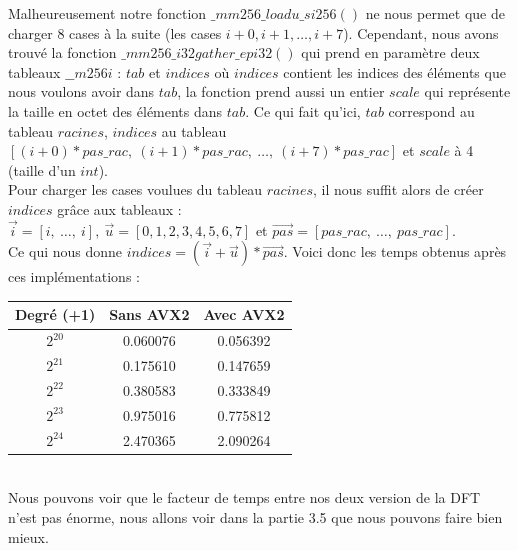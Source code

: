 \documentclass[12pt, a4paper]{article}
\begin{document}
Malheureusement notre fonction $\_mm256\_loadu\_si256()$ ne nous permet que de charger 8 cases à la suite (les cases $i+0, i+1,\dots,i+7$).
Cependant, nous avons trouvé la fonction $\_mm256\_i32gather\_epi32()$ qui prend en paramètre deux tableaux $\_\_m256i$ : $tab$ et $indices$ où $indices$ contient les indices des éléments que nous voulons avoir dans $tab$, la fonction prend aussi un entier $scale$ qui représente la taille en octet des éléments dans $tab$. Ce qui fait qu'ici, $tab$ correspond au tableau $racines$, $indices$ au tableau $[(i+0)*pas\_rac,\ (i+1)*pas\_rac,\ \dots,\ (i+7)*pas\_rac]$ et $scale$ à 4 (taille d'un $int$).\\
\indent Pour charger les cases voulues du tableau $racines$, il nous suffit alors de créer $indices$ grâce aux tableaux : \\ $\overrightarrow{i} = [i,\ \dots,\ i],\  \overrightarrow{u} = [0, 1, 2, 3, 4, 5, 6, 7]$ et $ \overrightarrow{pas} = [pas\_rac,\ \dots,\ pas\_rac]$. \\
Ce qui nous donne $indices = (\overrightarrow{i}+\overrightarrow{u})*\overrightarrow{pas}$.
\newpage	
Voici donc les temps obtenus après ces implémentations :

\begin{center}
\begin{tabular}{||c c c||}
\hline
Degré (+1) & Sans AVX2 & Avec AVX2 \\
\hline\hline
$2^{20}$ & 0.060076 & 0.056392 \\
\hline
$2^{21}$ & 0.175610 & 0.147659 \\
\hline
$2^{22}$ & 0.380583 & 0.333849 \\
\hline
$2^{23}$ & 0.975016 & 0.775812 \\
\hline
$2^{24}$ & 2.470365 & 2.090264 \\
\hline
\end{tabular}
\end{center}
{}
\ \\
\indent Nous pouvons voir que le facteur de temps entre nos deux version de la DFT n'est pas énorme, nous allons voir dans la partie 3.5 que nous pouvons faire bien mieux.
\end{document}
